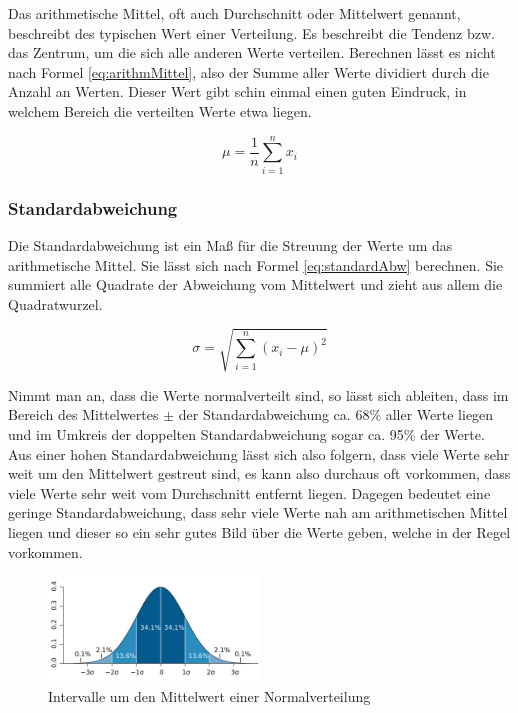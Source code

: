Das arithmetische Mittel, oft auch Durchschnitt oder Mittelwert genannt, beschreibt des typischen Wert einer Verteilung. Es beschreibt die Tendenz bzw. das Zentrum, um die sich alle anderen Werte verteilen. Berechnen lässt es nicht nach Formel \ref{eq:arithmMittel}, also der Summe aller Werte dividiert durch die Anzahl an Werten. Dieser Wert gibt schin einmal einen guten Eindruck, in welchem Bereich die verteilten Werte etwa liegen.

\begin{equation} \label{eq:arithmMittel}
\mu=\frac{1}{n} \sum_{i=1}^n x_i
\end{equation}

\subsubsection{Standardabweichung} 

Die Standardabweichung ist ein Maß für die Streuung der Werte um das arithmetische Mittel. Sie lässt sich nach Formel \ref{eq:standardAbw} berechnen. Sie summiert alle Quadrate der Abweichung vom Mittelwert und zieht aus allem die Quadratwurzel. 

\begin{equation} \label{eq:standardAbw}
    \sigma=\sqrt{\sum_{i=1}^{n}\left(x_{i}-\mu\right)^{2}}
\end{equation}

Nimmt man an, dass die Werte normalverteilt sind, so lässt sich ableiten, dass im Bereich des Mittelwertes $\pm$ der Standardabweichung ca. 68\% aller Werte liegen und im Umkreis der doppelten Standardabweichung sogar ca. 95\% der Werte. Aus einer hohen Standardabweichung lässt sich also folgern, dass viele Werte sehr weit um den Mittelwert gestreut sind, es kann also durchaus oft vorkommen, dass viele Werte sehr weit vom Durchschnitt entfernt liegen. Dagegen bedeutet eine geringe Standardabweichung, dass sehr viele Werte nah am arithmetischen Mittel liegen und dieser so ein sehr gutes Bild über die Werte geben, welche in der Regel vorkommen.

\begin{figure}[H]
    \centering
    \includegraphics[width=0.5\textwidth]{images/Normalverteilung.png}
    \caption{Intervalle um den Mittelwert einer Normalverteilung \cite{normalverteilung}}
    \label{fig:normalverteilung}
\end{figure}


